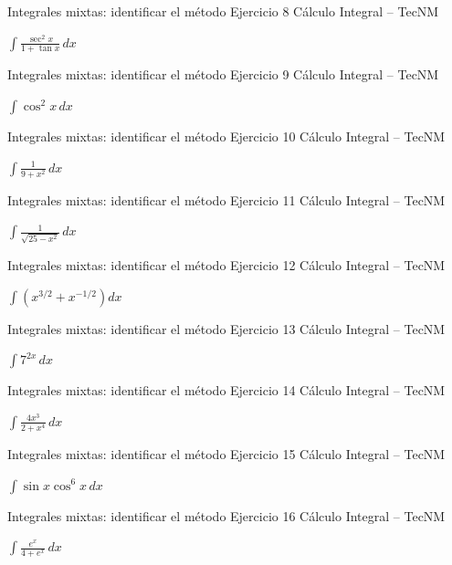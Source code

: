 \documentclass[aspectratio=169,12pt]{beamer}
\newcommand{\ejercicio}[1]{%
  \begin{center}
  \vfill
  {\fontsize{24}{30}\selectfont #1}
  \vfill
  \end{center}
}
\begin{document}
\begin{frame}{Integrales mixtas: identificar el método}
\small Ejercicio 8 \hfill Cálculo Integral -- TecNM
\ejercicio{$\displaystyle \int\frac{\sec^2x}{1+\tan x}\,dx$}
\end{frame}

\begin{frame}{Integrales mixtas: identificar el método}
\small Ejercicio 9 \hfill Cálculo Integral -- TecNM
\ejercicio{$\displaystyle \int\cos^2x\,dx$}
\end{frame}

\begin{frame}{Integrales mixtas: identificar el método}
\small Ejercicio 10 \hfill Cálculo Integral -- TecNM
\ejercicio{$\displaystyle \int\frac{1}{9+x^2}\,dx$}
\end{frame}

\begin{frame}{Integrales mixtas: identificar el método}
\small Ejercicio 11 \hfill Cálculo Integral -- TecNM
\ejercicio{$\displaystyle \int\frac{1}{\sqrt{25-x^2}}\,dx$}
\end{frame}

\begin{frame}{Integrales mixtas: identificar el método}
\small Ejercicio 12 \hfill Cálculo Integral -- TecNM
\ejercicio{$\displaystyle \int\left(x^{3/2}+x^{-1/2}\right)dx$}
\end{frame}

\begin{frame}{Integrales mixtas: identificar el método}
\small Ejercicio 13 \hfill Cálculo Integral -- TecNM
\ejercicio{$\displaystyle \int 7^{2x}\,dx$}
\end{frame}

\begin{frame}{Integrales mixtas: identificar el método}
\small Ejercicio 14 \hfill Cálculo Integral -- TecNM
\ejercicio{$\displaystyle \int\frac{4x^3}{2+x^4}\,dx$}
\end{frame}

\begin{frame}{Integrales mixtas: identificar el método}
\small Ejercicio 15 \hfill Cálculo Integral -- TecNM
\ejercicio{$\displaystyle \int\sin x\cos^6x\,dx$}
\end{frame}

\begin{frame}{Integrales mixtas: identificar el método}
\small Ejercicio 16 \hfill Cálculo Integral -- TecNM
\ejercicio{$\displaystyle \int\frac{e^x}{4+e^x}\,dx$}
\end{frame}
\end{document}
